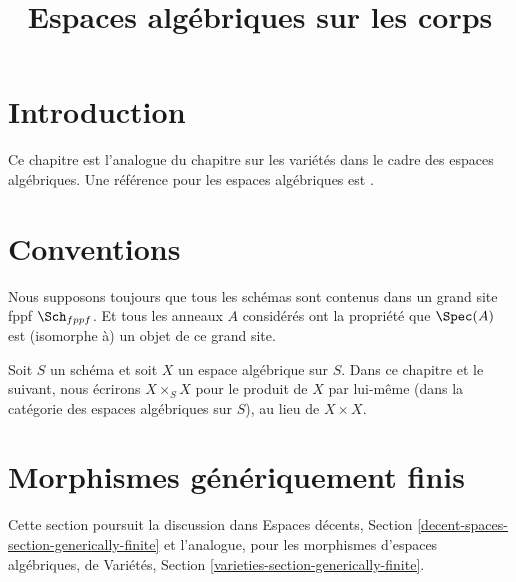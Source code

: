 

%


\title{Espaces algébriques sur les corps}


\maketitle

\label{section-phantom}

\tableofcontents

\section{Introduction}
\label{section-introduction}

\noindent
Ce chapitre est l'analogue du chapitre sur les variétés dans le cadre
des espaces algébriques. Une référence pour les espaces algébriques est
\cite{Kn}.


\section{Conventions}
\label{section-conventions}

\noindent
Nous supposons toujours que tous les schémas sont contenus dans
un grand site fppf $\Sch_{fppf}$. Et tous les anneaux $A$ considérés
ont la propriété que $\Spec(A)$ est (isomorphe à) un
objet de ce grand site.

\medskip\noindent
Soit $S$ un schéma et soit $X$ un espace algébrique sur $S$.
Dans ce chapitre et le suivant, nous écrirons $X \times_S X$
pour le produit de $X$ par lui-même (dans la catégorie des espaces algébriques
sur $S$), au lieu de $X \times X$.



\section{Morphismes génériquement finis}
\label{section-generically-finite}

\noindent
Cette section poursuit la discussion dans
Espaces décents, Section \ref{decent-spaces-section-generically-finite}
et l'analogue, pour les morphismes d'espaces algébriques, de
Variétés, Section \ref{varieties-section-generically-finite}.

